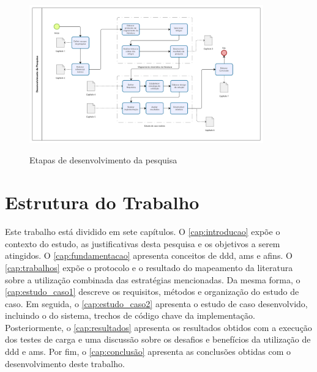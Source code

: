 
\begin{figure}[h!]
    \centering
    \caption{Etapas de desenvolvimento da pesquisa}
    \includegraphics[width=0.9\textwidth]{media/bpmn_metodo_recurso.png}
    \label{fig:metodo_recurso}
\end{figure}



\section{Estrutura do Trabalho}

Este trabalho está dividido em sete capítulos.  O \autoref{cap:introducao} expõe o contexto do estudo, as justificativas desta pesquisa e os objetivos a serem atingidos. O \autoref{cap:fundamentacao} apresenta conceitos de \acrshort{ddd}, \acrshort{ams} e afins. O \autoref{cap:trabalhos} expõe o protocolo e o resultado do mapeamento da literatura sobre a utilização combinada das estratégias mencionadas. Da mesma forma, o \autoref{cap:estudo_caso1} descreve os requisitos, métodos e organização do estudo de caso. Em seguida, o \autoref{cap:estudo_caso2} apresenta o estudo de caso desenvolvido, incluindo o  do sistema, trechos de código chave da implementação. Posteriormente, o \autoref{cap:resultados} apresenta os resultados obtidos com a execução dos testes de carga e uma discussão sobre os desafios e benefícios da utilização de \acrshort{ddd} e \acrshort{ams}. Por fim, o \autoref{cap:conclusão} apresenta as conclusões obtidas com o desenvolvimento deste trabalho.
